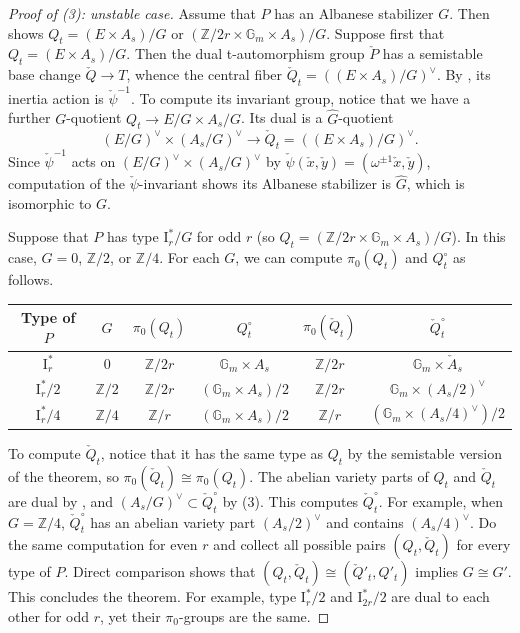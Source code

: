 \documentclass[reqno, letterpaper]{amsart}
\numberwithin{equation}{subsection}
\let\to\longrightarrow
\newcommand{\GG}{\mathbb{G}}
\newcommand{\ZZ}{\mathbb{Z}}
\begin{document}
			\begin{proof} [Proof of (3): unstable case]
				Assume that $P$ has an Albanese stabilizer $G$. Then  shows $Q_t = (E \times A_s)/G$ or $(\ZZ/2r \times \GG_m \times A_s)/G$. Suppose first that $Q_t = (E \times A_s)/G$. Then the dual t-automorphism group $\check P$ has a semistable base change $\check Q \to T$, whence the central fiber $\check Q_t = ((E \times A_s)/G)^\vee$. By , its inertia action is $\check \psi^{-1}$. To compute its invariant group, notice that we have a further $G$-quotient $Q_t \to E/G \times A_s/G$. Its dual is a $\hat G$-quotient
				\[ (E/G)^\vee \times (A_s/G)^\vee \to \check Q_t = ((E \times A_s)/G)^\vee .\]
				Since $\check \psi^{-1}$ acts on $(E/G)^\vee \times (A_s/G)^\vee$ by $\check \psi(\check x, \check y) = (\omega^{\pm1}\check x, \check y)$, computation of the $\check \psi$-invariant shows its Albanese stabilizer is $\hat G$, which is isomorphic to $G$.
				
				\medskip
				
				Suppose that $P$ has type $\mathrm I_r^*/G$ for odd $r$ (so $Q_t = (\ZZ/2r \times \GG_m \times A_s)/G$). In this case, $G = 0$, $\ZZ/2$, or $\ZZ/4$. For each $G$, we can compute $\pi_0(Q_t)$ and $Q_t^\circ$ as follows.
				\begin{center}
					\begin{tabular}{|c|c||c|c||c|c|} \hline
						Type of $P$ & $G$ & $\pi_0(Q_t)$ & $Q_t^\circ$ & $\pi_0(\check Q_t)$ & $\check Q_t^\circ$ \\ \hline\hline
						$\mathrm I_r^*$ & $0$ & $\ZZ/2r$ & $\GG_m \times A_s$ & $\ZZ/2r$ & $\GG_m \times \check A_s$ \\ \hline
						$\mathrm I_r^*/2$ & $\ZZ/2$ & $\ZZ/2r$ & $(\GG_m \times A_s)/2$ & $\ZZ/2r$ & $\GG_m \times (A_s/2)^\vee$\\ \hline
						$\mathrm I_r^*/4$ & $\ZZ/4$ & $\ZZ/r$ & $(\GG_m \times A_s)/2$ & $\ZZ/r$ & $(\GG_m \times (A_s/4)^\vee) / 2$ \\ \hline
					\end{tabular}
				\end{center}
				To compute $\check Q_t$, notice that it has the same type as $Q_t$ by the semistable version of the theorem, so $\pi_0(\check Q_t) \cong \pi_0(Q_t)$. The abelian variety parts of $Q_t$ and $\check Q_t$ are dual by , and $(A_s/G)^\vee \subset \check Q_t^\circ$ by (3). This computes $\check Q_t^\circ$. For example, when $G = \ZZ/4$, $\check Q_t^\circ$ has an abelian variety part $(A_s/2)^\vee$ and contains $(A_s/4)^\vee$. Do the same computation for even $r$ and collect all possible pairs $(Q_t, \check Q_t)$ for every type of $P$. Direct comparison shows that $(Q_t, \check Q_t) \cong (\check Q'_t, Q'_t)$ implies $G \cong G'$. This concludes the theorem. For example, type $\mathrm I_r^*/2$ and $\mathrm I_{2r}^*/2$ are dual to each other for odd $r$, yet their $\pi_0$-groups are the same.
			\end{proof}
			
\end{document}

